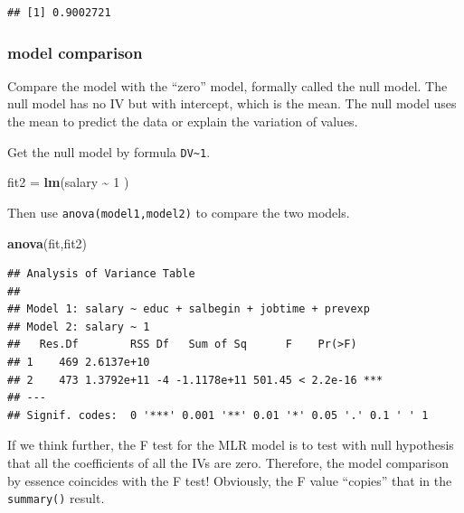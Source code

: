 \documentclass[
]{ctexart}
\newenvironment{Shaded}{\begin{snugshade}}{\end{snugshade}}
\newcommand{\DecValTok}[1]{\textcolor[rgb]{0.00,0.00,0.81}{#1}}
\newcommand{\FunctionTok}[1]{\textcolor[rgb]{0.13,0.29,0.53}{\textbf{#1}}}
\newcommand{\NormalTok}[1]{#1}
\newcommand{\OtherTok}[1]{\textcolor[rgb]{0.56,0.35,0.01}{#1}}
\newcommand{\SpecialCharTok}[1]{\textcolor[rgb]{0.81,0.36,0.00}{\textbf{#1}}}
\begin{document}
\begin{Shaded}
\end{Shaded}

\begin{verbatim}
## [1] 0.9002721
\end{verbatim}

\hypertarget{model-comparison-1}{%
\subsubsection{model comparison}\label{model-comparison-1}}

Compare the model with the ``zero'' model, formally called the null
model. The null model has no IV but with intercept, which is the mean.
The null model uses the mean to predict the data or explain the
variation of values.

Get the null model by formula \texttt{DV\textasciitilde{}1}.

\begin{Shaded}
\begin{Highlighting}[]
\NormalTok{fit2 }\OtherTok{=} \FunctionTok{lm}\NormalTok{(salary }\SpecialCharTok{\textasciitilde{}} \DecValTok{1}\NormalTok{ )}
\end{Highlighting}
\end{Shaded}

Then use \texttt{anova(model1,model2)} to compare the two models.

\begin{Shaded}
\begin{Highlighting}[]
\FunctionTok{anova}\NormalTok{(fit,fit2)}
\end{Highlighting}
\end{Shaded}

\begin{verbatim}
## Analysis of Variance Table
## 
## Model 1: salary ~ educ + salbegin + jobtime + prevexp
## Model 2: salary ~ 1
##   Res.Df        RSS Df   Sum of Sq      F    Pr(>F)    
## 1    469 2.6137e+10                                    
## 2    473 1.3792e+11 -4 -1.1178e+11 501.45 < 2.2e-16 ***
## ---
## Signif. codes:  0 '***' 0.001 '**' 0.01 '*' 0.05 '.' 0.1 ' ' 1
\end{verbatim}

If we think further, the F test for the MLR model is to test with null
hypothesis that all the coefficients of all the IVs are zero. Therefore,
the model comparison by essence coincides with the F test! Obviously,
the F value ``copies'' that in the \texttt{summary()} result.
\end{document}
